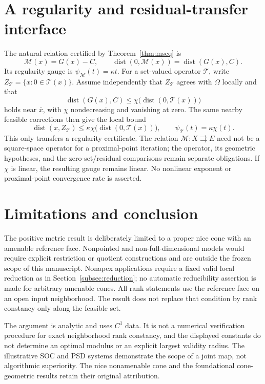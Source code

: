\documentclass[11pt]{article}
\numberwithin{equation}{section}
\theoremstyle{definition}
\theoremstyle{remark}
\DeclareMathOperator{\dist}{dist}
\newcommand{\xb}{\bar x}
\newcommand{\dset}[2]{\dist(#1,#2)}
\begin{document}
\section{A regularity and residual-transfer interface}
\label{sec:residual-interface}

The natural relation certified by Theorem~\ref{thm:mscq} is
\[
 \mathcal M(x)=G(x)-C,\qquad
 \dset{0}{\mathcal M(x)}=\dset{G(x)}{C}.
\]
Its regularity gauge is $\psi_{\mathcal M}(t)=\kappa t$.
For a set-valued operator $\mathcal T$, write
$Z_{\mathcal T}=\{x:0\in\mathcal T(x)\}$. Assume independently that
$Z_{\mathcal T}$ agrees with $\Omega$ locally and that
\begin{equation}
 \dset{G(x)}{C}\leq
 \chi\bigl(\dset{0}{\mathcal T(x)}\bigr)
 \label{eq:operator-comparison}
\end{equation}
holds near $\xb$, with $\chi$ nondecreasing and vanishing at zero.
The same nearby feasible corrections then give the local bound
\begin{equation}
 \dset{x}{Z_{\mathcal T}}
 \leq\kappa\chi\bigl(\dset{0}{\mathcal T(x)}\bigr),
 \qquad \psi_{\mathcal T}(t)=\kappa\chi(t).
 \label{eq:operator-gauge}
\end{equation}
This only transfers a regularity certificate. The relation
$\mathcal M:X\rightrightarrows E$ need not be a square-space operator
for a proximal-point iteration; the operator, its geometric hypotheses,
and the zero-set/residual comparisons remain separate obligations.
If $\chi$ is linear, the resulting gauge remains linear. No nonlinear
exponent or proximal-point convergence rate is asserted.

\section{Limitations and conclusion}
\label{sec:conclusion}

The positive metric result is deliberately limited to a proper nice
cone with an amenable reference face. Nonpointed and non-full-dimensional
models would require explicit restriction or quotient constructions and
are outside the frozen scope of this manuscript. Nonapex applications
require a fixed valid local reduction as in
Section~\ref{subsec:reduction}; no automatic reducibility assertion is
made for arbitrary amenable cones. All rank statements use the reference
face on an open input neighborhood. The result does not replace that
condition by rank constancy only along the feasible set.

The argument is analytic and uses $C^1$ data. It is not a numerical
verification procedure for exact neighborhood rank constancy, and the
displayed constants do not determine an optimal modulus or an explicit
largest validity radius. The illustrative SOC and PSD systems demonstrate
the scope of a joint map, not algorithmic superiority. The nice
nonamenable cone and the foundational cone-geometric results retain their
original attribution.
\end{document}
